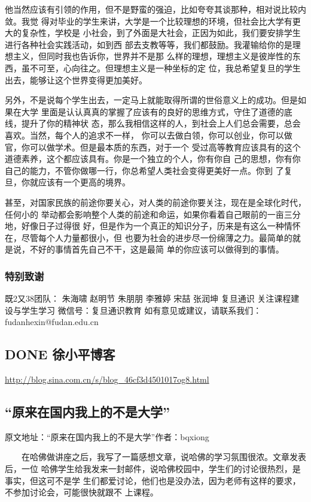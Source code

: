 \documentclass[11pt]{ctexart}
\begin{document}
{{{{他当然应该有引领的作用，但不是野蛮的强迫，比如夸夸其谈那种，相对说比较内敛。我觉
得对毕业的学生来讲，大学是一个比较理想的环境，但社会比大学有更大的复杂性，学校是
小社会，到了外面是大社会，正因为如此，我们要安排学生进行各种社会实践活动，如到西
部去支教等等，我们都鼓励。我灌输给你的是理想主义，但同时我也告诉你，世界并不是那
么样的理想，理想主义是彼岸性的东西，虽不可至，心向往之。但理想主义是一种坐标的定
位，我总希望复旦的学生出去，能够让这个世界变得更加美好。

另外，不是说每个学生出去，一定马上就能取得所谓的世俗意义上的成功。但是如果在大学
里面是认认真真的掌握了应该有的良好的思维方式，守住了道德的底线，提升了你的精神状
态，那么我相信这样的人，到社会上人们总会需要，总会喜欢。当然，每个人的追求不一样，
你可以去做白领，你可以创业，你可以做官，你可以做学术。但是最本质的东西，对于一个
受过高等教育应该具有的这个道德素养，这个都应该具有。你是一个独立的个人，你有你自
己的思想，你有你自己的能力，不管你做哪一行，你总希望人类社会变得更美好一点。你到
了复旦，你就应该有一个更高的境界。

甚至，对国家民族的前途你要关心，对人类的前途你要关注，现在是全球化时代，任何小的
举动都会影响整个人类的前途和命运，如果你看着自己眼前的一亩三分地，好像日子过得很
好，但是作为一个真正的知识分子，历来是有这么一种情怀在，尽管每个人力量都很小，但
也要为社会的进步尽一份绵薄之力。最简单的就是说，不好的事情首先自己不干，这是最简
单的你应该可以做得到的事情。

\subsubsection{特别致谢}
\label{sec:org2ac9f43}
既2又38团队：
朱海啸 赵明节 朱朋朋 李雅婷 宋喆 张润坤
复旦通识 关注课程建设与学生学习
微信号：复旦通识教育
如有意见或建议，请联系我们：fudanhexin@fudan.edu.cn
\subsection{{\bfseries\sffamily DONE} 徐小平博客}
\label{sec:org3e26f23}
\url{http://blog.sina.com.cn/s/blog\_46cf3d4501017og8.html}
\subsection{“原来在国内我上的不是大学”}
\label{sec:org614d4ff}
原文地址：“原来在国内我上的不是大学”作者：bqxiong

　　在哈佛做讲座之后，我写了一篇感想文章，说哈佛的学习氛围很浓。文章发表后，一位
哈佛学生给我发来一封邮件，说哈佛校园中，学生们的讨论很热烈，是事实，但这可不是学
生们都爱讨论，他们也是没办法，因为老师有这样的要求，不参加讨论会，可能很快就跟不
上课程。


}}}}
\end{document}
